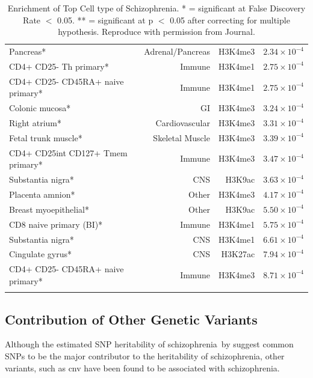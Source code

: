 \documentclass[12pt]{scrbook}
\newcommand*{\scz}{schizophrenia}
\begin{document}
\begin{singlespace}
\begin{longtable}{p{6cm}rrr}
			Pancreas* & Adrenal/Pancreas & H3K4me3 & $2.34\times 10^{-4}$ \\
			CD4+ CD25- Th primary* & Immune & H3K4me1 & $2.75\times 10^{-4}$ \\
			CD4+ CD25- CD45RA+ naive primary* & Immune & H3K4me1 & $2.75\times 10^{-4}$\\
			Colonic mucosa* & GI    & H3K4me3 & $3.24\times 10^{-4}$ \\
			Right atrium* & Cardiovascular & H3K4me3 & $3.31\times 10^{-4}$ \\
			Fetal trunk muscle* & Skeletal Muscle & H3K4me3 & $3.39\times 10^{-4}$ \\
			CD4+ CD25int CD127+ Tmem primary* & Immune & H3K4me3 & $3.47\times 10^{-4}$ \\
			Substantia nigra* & CNS   & H3K9ac & $3.63\times 10^{-4}$ \\
			Placenta amnion* & Other & H3K4me3 & $4.17\times 10^{-4}$ \\
			Breast myoepithelial* & Other & H3K9ac & $5.50\times 10^{-4}$ \\
			CD8 naive primary (BI)* & Immune & H3K4me1 & $5.75\times 10^{-4}$ \\
			Substantia nigra* & CNS   & H3K4me1 & $6.61\times 10^{-4}$ \\
			Cingulate gyrus* & CNS   & H3K27ac & $7.94\times 10^{-4}$ \\
			CD4+ CD25- CD45RA+ naive primary* & Immune & H3K4me3 & $8.71\times 10^{-4}$ \\
			\bottomrule
			\caption[Enrichment of Top Cell Type of Schizophrenia]{Enrichment of Top Cell type of Schizophrenia.
				* = significant at False Discovery Rate $<$ 0.05.
				** = significant at p $<$ 0.05 after correcting for multiple hypothesis. 
				Reproduce with permission from Journal.\citep{Finucane2015}}
			\label{tab:cellTypeScz}%
		\end{longtable}%
	\end{singlespace}	

\subsection{Contribution of Other Genetic Variants}
Although the estimated \gls{SNP} heritability of \scz\ by \citet{Bulik-Sullivan2015} suggest common \glspl{SNP} to be the major contributor to the heritability of \scz, other variants, such as \gls{cnv} have been found to be associated with \scz.
\end{document}
